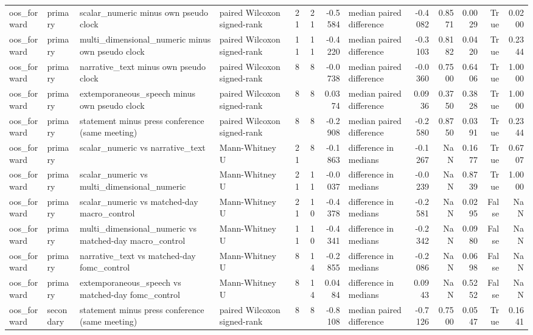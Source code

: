 \begin{tabular}{llllrrrlrrrrr}
oos_forward & primary & scalar_numeric minus own pseudo clock & paired Wilcoxon signed-rank & 21 & 21 & -0.5584 & median paired difference & -0.4082 & 0.8571 & 0.0029 & True & 0.0200 \\
oos_forward & primary & multi_dimensional_numeric minus own pseudo clock & paired Wilcoxon signed-rank & 11 & 11 & -0.4220 & median paired difference & -0.3103 & 0.8182 & 0.0420 & True & 0.2344 \\
oos_forward & primary & narrative_text minus own pseudo clock & paired Wilcoxon signed-rank & 8 & 8 & -0.0738 & median paired difference & -0.0360 & 0.7500 & 0.6406 & True & 1.0000 \\
oos_forward & primary & extemporaneous_speech minus own pseudo clock & paired Wilcoxon signed-rank & 8 & 8 & 0.0374 & median paired difference & 0.0936 & 0.3750 & 0.3828 & True & 1.0000 \\
oos_forward & primary & statement minus press conference (same meeting) & paired Wilcoxon signed-rank & 8 & 8 & -0.2908 & median paired difference & -0.2580 & 0.8750 & 0.0391 & True & 0.2344 \\
oos_forward & primary & scalar_numeric vs narrative_text & Mann-Whitney U & 21 & 8 & -0.1863 & difference in medians & -0.1267 & NaN & 0.1677 & True & 0.6707 \\
oos_forward & primary & scalar_numeric vs multi_dimensional_numeric & Mann-Whitney U & 21 & 11 & -0.0037 & difference in medians & -0.0239 & NaN & 0.8739 & True & 1.0000 \\
oos_forward & primary & scalar_numeric vs matched-day macro_control & Mann-Whitney U & 21 & 10 & -0.4378 & difference in medians & -0.2581 & NaN & 0.0295 & False & NaN \\
oos_forward & primary & multi_dimensional_numeric vs matched-day macro_control & Mann-Whitney U & 11 & 10 & -0.4341 & difference in medians & -0.2342 & NaN & 0.0980 & False & NaN \\
oos_forward & primary & narrative_text vs matched-day fomc_control & Mann-Whitney U & 8 & 14 & -0.2855 & difference in medians & -0.2086 & NaN & 0.0698 & False & NaN \\
oos_forward & primary & extemporaneous_speech vs matched-day fomc_control & Mann-Whitney U & 8 & 14 & 0.0484 & difference in medians & 0.0943 & NaN & 0.5252 & False & NaN \\
oos_forward & secondary & statement minus press conference (same meeting) & paired Wilcoxon signed-rank & 8 & 8 & -0.8108 & median paired difference & -0.7126 & 0.7500 & 0.0547 & True & 0.1641 \\

\end{tabular}
